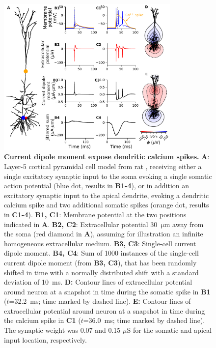 \documentclass[preprint,10pt,authoryear]{elsarticle}
\begin{document}
\begin{figure}[H]
	\centering
	\includegraphics[width=0.8\textwidth]{ca_spike_hay}
	\caption{\textbf{Current dipole moment expose dendritic calcium spikes.}
		\textbf{A}: Layer-5 cortical pyramidal cell model from rat \citep{HAY2011}, receiving either a single excitatory synaptic input to the soma evoking a single somatic action potential (blue dot, results in \textbf{B1-4}), or in addition an excitatory synaptic input to the apical dendrite, evoking a dendritic calcium spike and two additional somatic spikes (orange dot, results in \textbf{C1-4}). 
		\textbf{B1, C1}: Membrane potential at the two positions indicated in \textbf{A}.
		\textbf{B2, C2}: Extracellular potential 30~$\si{\um}$ away from the soma (red diamond in \textbf{A}), assuming for illustration an infinite homogeneous extracellular medium. 
		\textbf{B3, C3}: Single-cell current dipole moment. 
		\textbf{B4, C4}: Sum of 1000 instances of the single-cell current dipole moment (from \textbf{B3, C3}), that has been randomly shifted in time with a normally distributed shift with a standard deviation of 10~ms. 
\textbf{D:} Contour lines of extracellular potential around neuron at a snapshot in time during the somatic spike in \textbf{B1} ($t$=32.2~ms; time marked by dashed line).
\textbf{E:} Contour lines of extracellular potential around neuron at a snapshot in time during the calcium spike in \textbf{C1} ($t$=36.0~ms; time marked by dashed line).
The synaptic weight was 0.07 and 0.15 $\mu$S for the somatic and apical input location, respectively.
	}
	\label{fig:ca_spike}
\end{figure}
\end{document}

